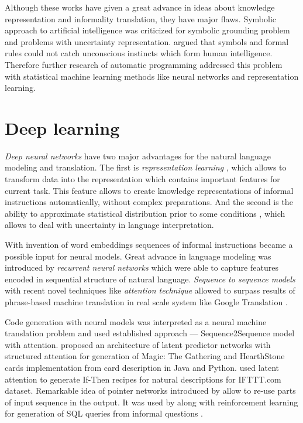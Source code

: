 Although these works have given a great advance in ideas about knowledge representation and informality translation, they have major flaws. Symbolic approach to artificial intelligence was criticized \parencite{mcdermott1987critique, harnad1990symbol} for symbolic grounding problem and problems with uncertainty representation. \cite{dreyfus1994computers} argued that symbols and formal rules could not catch unconscious instincts which form human intelligence. Therefore further research of automatic programming addressed this problem with statistical machine learning methods like neural networks and representation learning.

\section{Deep learning} 
\emph{Deep neural networks} have two major advantages for the natural language modeling and translation. The first is \emph{representation learning} \parencite{Bengio2013}, which allows to transform data into the representation which contains important features for current task. This feature allows to create knowledge representations of informal instructions automatically, without complex preparations. And the second is the ability to approximate statistical distribution prior to some conditions \parencite{white1992artificial}, which allows to deal with uncertainty in language interpretation. 

With invention of word embeddings \parencite{bengio2003neural} sequences of informal instructions became a possible input for neural models. Great advance in language modeling was introduced by \emph{recurrent neural networks} \parencite{sundermeyer2012lstm, hochreiter1997long, Jozefowicz2016, Gers2001} which were able to capture features encoded in sequential structure of natural language. \emph{Sequence to sequence models} \parencite{NIPS2014_5346} with recent novel techniques like \emph{attention technique} \parencite{Luong2015, Jean2014, Bahdanau2014} allowed to surpass results of phrase-based machine translation in real scale system like Google Translation \parencite{Wu2016}. 

Code generation with neural models was interpreted as a neural machine translation problem and used established approach --- Sequence2Sequence model with attention. \cite{Ling2016} proposed an architecture of latent predictor networks with structured attention for generation of Magic: The Gathering and HearthStone cards implementation from card description in Java and Python. \cite{Chen2016} used latent attention to generate If-Then recipes for natural descriptions for IFTTT.com dataset. Remarkable idea of pointer networks introduced by \cite{NIPS2015_5866} allow to re-use parts of input sequence in the output. It was used by \cite{Zhong2017} along with reinforcement learning for generation of SQL queries from informal questions \parencite{Bhoopchand2016}. 

